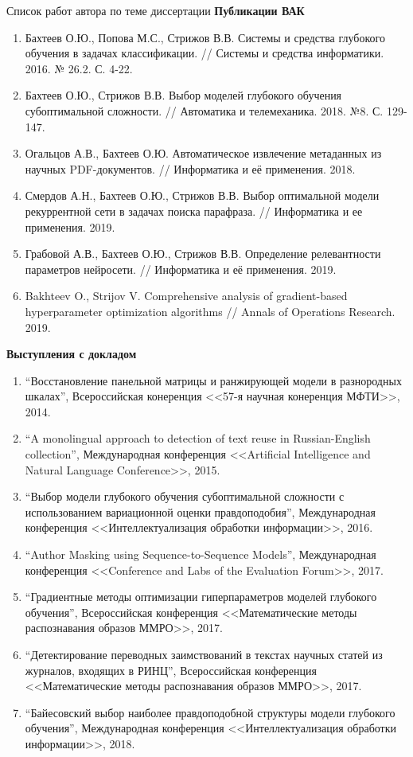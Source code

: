 \documentclass[usenames,dvipsnames,11pt,pdf,utf8,russian,aspectratio=43]{beamer}
\begin{document}
\begin{frame}{Список работ автора по теме диссертации}
\tiny
\textbf{Публикации ВАК}
\begin{enumerate}
\item Бахтеев О.Ю., Попова М.С., Стрижов В.В. Системы и средства глубокого обучения в задачах классификации. // Системы и средства информатики. 2016. № 26.2. С. 4-22.
\item Бахтеев О.Ю., Стрижов В.В. Выбор моделей глубокого обучения субоптимальной сложности. // Автоматика и телемеханика. 2018. №8. С. 129-147.
\item Огальцов А.В., Бахтеев О.Ю. Автоматическое извлечение метаданных из научных PDF-документов. // Информатика и её применения. 2018.
\item Смердов А.Н., Бахтеев О.Ю., Стрижов В.В. Выбор оптимальной модели рекуррентной сети в задачах поиска парафраза. // Информатика и ее применения. 2019.
\item Грабовой А.В., Бахтеев О.Ю., Стрижов В.В. Определение релевантности параметров нейросети. // Информатика и её применения. 2019.
\item Bakhteev O., Strijov V. Comprehensive analysis of gradient-based hyperparameter optimization algorithms // Annals of Operations Research. 2019.
\end{enumerate}
\textbf{Выступления с докладом}
\begin{enumerate}
\item ``Восстановление панельной матрицы и ранжирующей модели в разнородных шкалах'', Всероссийская конеренция <<57-я научная конеренция МФТИ>>, 2014.
\item ``A monolingual approach to detection of text reuse in Russian-English collection'', Международная конференция <<Artificial Intelligence and Natural Language Conference>>, 2015.
\item ``Выбор модели глубокого обучения субоптимальной сложности с использованием вариационной оценки правдоподобия'', Международная конференция <<Интеллектуализация обработки информации>>, 2016.
\item ``Author Masking using Sequence-to-Sequence Models'', Международная конференция <<Conference and Labs of the Evaluation Forum>>, 2017.
\item ``Градиентные методы оптимизации гиперпараметров моделей глубокого обучения'', Всероссийская конференция <<Математические методы распознавания образов ММРО>>, 2017.
\item ``Детектирование переводных заимствований в текстах научных статей из журналов, входящих в РИНЦ'', Всероссийская конференция <<Математические методы распознавания образов ММРО>>, 2017.
\item ``Байесовский выбор наиболее правдоподобной структуры модели глубокого обучения'', Международная конференция <<Интеллектуализация обработки информации>>, 2018.
\end{enumerate}
\end{frame}
\end{document}
